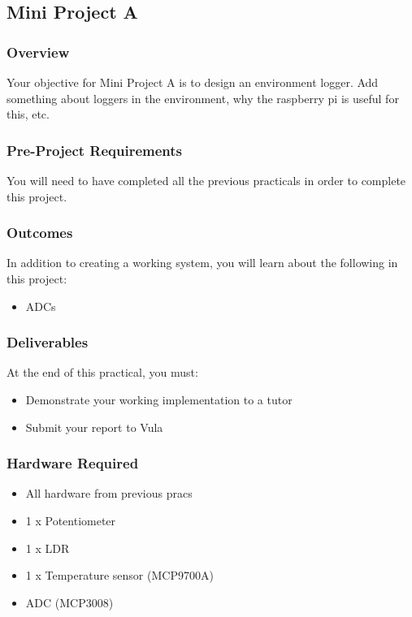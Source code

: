 \subsection{Mini Project A}
\label{sec:ProjA}

\subsubsection{Overview}
Your objective for Mini Project A is to design an environment logger. Add something about loggers in the environment, why the raspberry pi is useful for this, etc.

\subsubsection{Pre-Project Requirements}
You will need to have completed all the previous practicals in order to complete this project.

\subsubsection{Outcomes}
In addition to creating a working system, you will learn about the following in this project:
\begin{itemize}
    \item ADCs
\end{itemize}

\subsubsection{Deliverables}
At the end of this practical, you must:
\begin{itemize}
    \item Demonstrate your working implementation to a tutor
    \item Submit your report to Vula
\end{itemize}

\subsubsection{Hardware Required}
\begin{itemize}
    \item All hardware from previous pracs
    \item 1 x Potentiometer
    \item 1 x LDR
    \item 1 x Temperature sensor (MCP9700A)
    \item ADC (MCP3008)
\end{itemize}


